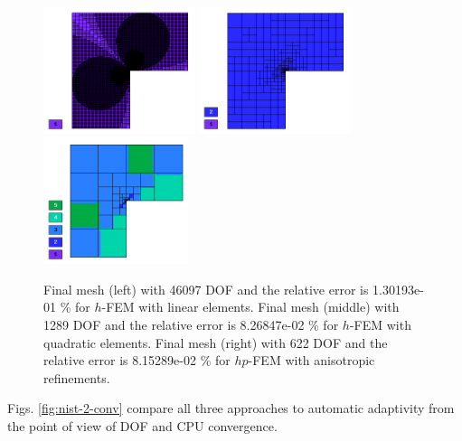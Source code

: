 \documentclass[12pt]{elsarticle}
\begin{document}
\begin{figure}[H]
\centering
\vspace{-5mm}
\includegraphics[height=3.7cm]{nist/nist-2/mesh_h1_aniso.png}
\includegraphics[height=3.7cm]{nist/nist-2/mesh_h2_aniso.png}
\includegraphics[height=3.7cm]{nist/nist-2/mesh_hp_aniso.png}
\vspace{-3mm}
\caption{
Final mesh (left) with 46097 DOF and the relative error is 1.30193e-01 \% for $h$-FEM with linear elements.
Final mesh (middle) with 1289 DOF and the relative error is 8.26847e-02 \% for $h$-FEM with quadratic elements.
Final mesh (right) with 622 DOF and the relative error is 8.15289e-02 \% for $hp$-FEM with anisotropic refinements.}
\label{fig:nist-2-hp-aniso}
\vspace{-3mm}
\end{figure}

Figs. \ref{fig:nist-2-conv} compare all
three approaches to automatic adaptivity from the point
of view of DOF and CPU convergence.
\end{document}
